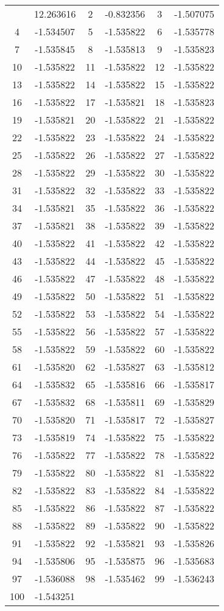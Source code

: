 \documentclass[12pt]{article}
\begin{document}
\begin{longtable}{@{}cc|cc|cc@{}}
\bottomrule
\endlastfoot
1 & 12.263616 & 2 & -0.832356 & 3 & -1.507075 \\
4 & -1.534507 & 5 & -1.535822 & 6 & -1.535778 \\
7 & -1.535845 & 8 & -1.535813 & 9 & -1.535823 \\
10 & -1.535822 & 11 & -1.535822 & 12 & -1.535822 \\
13 & -1.535822 & 14 & -1.535822 & 15 & -1.535822 \\
16 & -1.535822 & 17 & -1.535821 & 18 & -1.535823 \\
19 & -1.535821 & 20 & -1.535822 & 21 & -1.535822 \\
22 & -1.535822 & 23 & -1.535822 & 24 & -1.535822 \\
25 & -1.535822 & 26 & -1.535822 & 27 & -1.535822 \\
28 & -1.535822 & 29 & -1.535822 & 30 & -1.535822 \\
31 & -1.535822 & 32 & -1.535822 & 33 & -1.535822 \\
34 & -1.535821 & 35 & -1.535822 & 36 & -1.535822 \\
37 & -1.535821 & 38 & -1.535822 & 39 & -1.535822 \\
40 & -1.535822 & 41 & -1.535822 & 42 & -1.535822 \\
43 & -1.535822 & 44 & -1.535822 & 45 & -1.535822 \\
46 & -1.535822 & 47 & -1.535822 & 48 & -1.535822 \\
49 & -1.535822 & 50 & -1.535822 & 51 & -1.535822 \\
52 & -1.535822 & 53 & -1.535822 & 54 & -1.535822 \\
55 & -1.535822 & 56 & -1.535822 & 57 & -1.535822 \\
58 & -1.535822 & 59 & -1.535822 & 60 & -1.535822 \\
61 & -1.535820 & 62 & -1.535827 & 63 & -1.535812 \\
64 & -1.535832 & 65 & -1.535816 & 66 & -1.535817 \\
67 & -1.535832 & 68 & -1.535811 & 69 & -1.535829 \\
70 & -1.535820 & 71 & -1.535817 & 72 & -1.535827 \\
73 & -1.535819 & 74 & -1.535822 & 75 & -1.535822 \\
76 & -1.535822 & 77 & -1.535822 & 78 & -1.535822 \\
79 & -1.535822 & 80 & -1.535822 & 81 & -1.535822 \\
82 & -1.535822 & 83 & -1.535822 & 84 & -1.535822 \\
85 & -1.535822 & 86 & -1.535822 & 87 & -1.535822 \\
88 & -1.535822 & 89 & -1.535822 & 90 & -1.535822 \\
91 & -1.535822 & 92 & -1.535821 & 93 & -1.535826 \\
94 & -1.535806 & 95 & -1.535875 & 96 & -1.535683 \\
97 & -1.536088 & 98 & -1.535462 & 99 & -1.536243 \\
100 & -1.543251 &  &  &  &  \\

\end{longtable}
\end{document}
